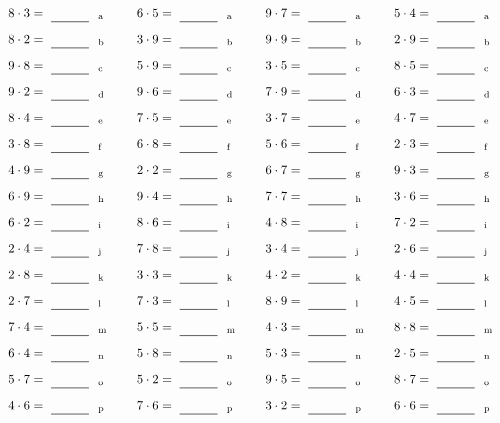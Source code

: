 \documentclass
[
  draft    = true,
  fontsize = 11pt,
  parskip  = half-
]
{scrartcl}
\begin{document}
\par\vfill\par
\begin{align*}
    \pline{8\cdot3}&=\rline{a}
  & \pline{6\cdot5}&=\rline{a}
  & \pline{9\cdot7}&=\rline{a}
  & \pline{5\cdot4}&=\rline{a} \\[1ex]
    \pline{8\cdot2}&=\rline{b}
  & \pline{3\cdot9}&=\rline{b}
  & \pline{9\cdot9}&=\rline{b}
  & \pline{2\cdot9}&=\rline{b} \\[1ex]
    \pline{9\cdot8}&=\rline{c}
  & \pline{5\cdot9}&=\rline{c}
  & \pline{3\cdot5}&=\rline{c}
  & \pline{8\cdot5}&=\rline{c} \\[1ex]
    \pline{9\cdot2}&=\rline{d}
  & \pline{9\cdot6}&=\rline{d}
  & \pline{7\cdot9}&=\rline{d}
  & \pline{6\cdot3}&=\rline{d} \\[1ex]
    \pline{8\cdot4}&=\rline{e}
  & \pline{7\cdot5}&=\rline{e}
  & \pline{3\cdot7}&=\rline{e}
  & \pline{4\cdot7}&=\rline{e} \\[1ex]
    \pline{3\cdot8}&=\rline{f}
  & \pline{6\cdot8}&=\rline{f}
  & \pline{5\cdot6}&=\rline{f}
  & \pline{2\cdot3}&=\rline{f} \\[1ex]
    \pline{4\cdot9}&=\rline{g}
  & \pline{2\cdot2}&=\rline{g}
  & \pline{6\cdot7}&=\rline{g}
  & \pline{9\cdot3}&=\rline{g} \\[1ex]
    \pline{6\cdot9}&=\rline{h}
  & \pline{9\cdot4}&=\rline{h}
  & \pline{7\cdot7}&=\rline{h}
  & \pline{3\cdot6}&=\rline{h} \\[1ex]
    \pline{6\cdot2}&=\rline{i}
  & \pline{8\cdot6}&=\rline{i}
  & \pline{4\cdot8}&=\rline{i}
  & \pline{7\cdot2}&=\rline{i} \\[1ex]
    \pline{2\cdot4}&=\rline{j}
  & \pline{7\cdot8}&=\rline{j}
  & \pline{3\cdot4}&=\rline{j}
  & \pline{2\cdot6}&=\rline{j} \\[1ex]
    \pline{2\cdot8}&=\rline{k}
  & \pline{3\cdot3}&=\rline{k}
  & \pline{4\cdot2}&=\rline{k}
  & \pline{4\cdot4}&=\rline{k} \\[1ex]
    \pline{2\cdot7}&=\rline{l}
  & \pline{7\cdot3}&=\rline{l}
  & \pline{8\cdot9}&=\rline{l}
  & \pline{4\cdot5}&=\rline{l} \\[1ex]
    \pline{7\cdot4}&=\rline{m}
  & \pline{5\cdot5}&=\rline{m}
  & \pline{4\cdot3}&=\rline{m}
  & \pline{8\cdot8}&=\rline{m} \\[1ex]
    \pline{6\cdot4}&=\rline{n}
  & \pline{5\cdot8}&=\rline{n}
  & \pline{5\cdot3}&=\rline{n}
  & \pline{2\cdot5}&=\rline{n} \\[1ex]
    \pline{5\cdot7}&=\rline{o}
  & \pline{5\cdot2}&=\rline{o}
  & \pline{9\cdot5}&=\rline{o}
  & \pline{8\cdot7}&=\rline{o} \\[1ex]
    \pline{4\cdot6}&=\rline{p}
  & \pline{7\cdot6}&=\rline{p}
  & \pline{3\cdot2}&=\rline{p}
  & \pline{6\cdot6}&=\rline{p}
\end{align*}
\end{document}
